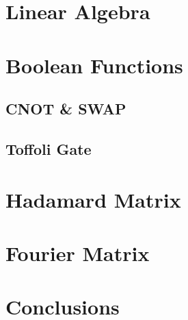 \documentclass[oneside]{thesisclass}
\begin{document}
\chapter{Linear Algebra}

\chapter{Boolean Functions}

\section{CNOT \& SWAP}

\section{Toffoli Gate}

\chapter{Hadamard Matrix}

\chapter{Fourier Matrix}

\chapter{Conclusions}




\end{document}
